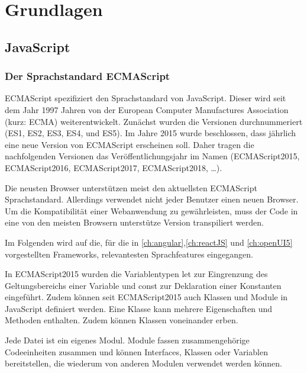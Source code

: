 
\chapter{Grundlagen}

\section{JavaScript}

\subsection{Der Sprachstandard ECMAScript}\label{sec:der-sprachstandard-ecmascript}
ECMAScript spezifiziert den Sprachstandard von JavaScript. Dieser wird seit dem Jahr 1997 Jahren von der European Computer Manufactures Association (kurz: ECMA) weiterentwickelt. Zunächst wurden die Versionen durchnummeriert (ES1, ES2, ES3, ES4, und ES5). Im Jahre 2015 wurde beschlossen, dass jährlich eine neue Version von ECMAScript erscheinen soll. Daher tragen die nachfolgenden Versionen das Veröffentlichungsjahr im Namen (ECMAScript2015, ECMAScript2016, ECMAScript2017, ECMAScript2018, …). 

Die neusten Browser unterstützen meist den aktuellsten ECMAScript Sprachstandard. Allerdings verwendet nicht jeder Benutzer einen neuen Browser. Um die Kompatibilität einer Webanwendung zu gewährleisten, muss der Code in eine von den meisten Browsern unterstütze Version transpiliert werden.\autocites[vgl.][27\psqq]{Woiwode.2018}[vgl.][]{Terlson.2018}[vgl.][13\psqq]{Steyer.2017}

Im Folgenden wird auf die, für die in \autoref{ch:angular},\ref{ch:reactJS} und \ref{ch:openUI5} vorgestellten Frameworks, relevantesten Sprachfeatures eingegangen.  

In ECMAScript2015 wurden die Variablentypen let zur Eingrenzung des Geltungsbereichs einer Variable und const zur Deklaration einer Konstanten eingeführt. Zudem können seit ECMAScript2015 auch Klassen und Module in JavaScript definiert werden. Eine Klasse kann mehrere Eigenschaften und Methoden enthalten. Zudem können Klassen voneinander erben.

Jede Datei ist ein eigenes Modul. Module fassen zusammengehörige Codeeinheiten zusammen und können Interfaces, Klassen oder Variablen bereitstellen, die wiederum von anderen Modulen verwendet werden können.\autocites[vgl.][34\psq]{Woiwode.2018}[vgl.][19\psqq]{Steyer.2017}

